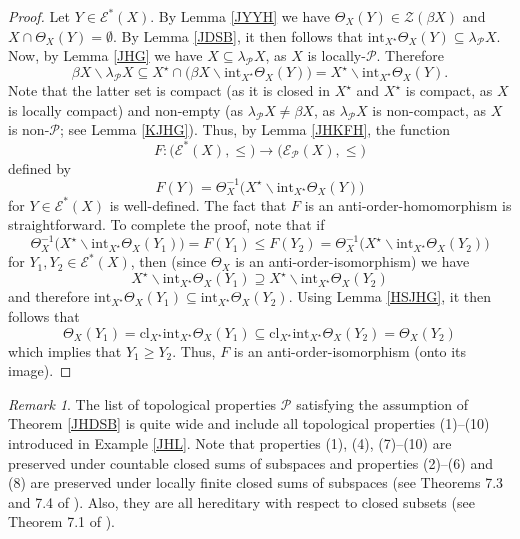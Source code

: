 \documentclass{amsart}
\theoremstyle{definition}
\theoremstyle{remark}
\newtheorem{remark}[theorem]{Remark}
\theoremstyle{notation}
\numberwithin{equation}{section}
\begin{document}
\begin{proof}
Let $Y\in{\mathscr E}^*(X)$. By Lemma \ref{JYYH}  we have $\Theta_X(Y) \in {\mathscr Z}(\beta X)$ and  $X\cap \Theta_X(Y)=\emptyset$. By Lemma
\ref{JDSB}, it then follows that  $\mbox{int}_{X^\star}\Theta_X(Y) \subseteq \lambda_{{\mathcal P}} X$. Now, by Lemma \ref{JHG} we have $X\subseteq \lambda_{{\mathcal P}} X$, as $X$ is
locally-${\mathcal P}$. Therefore
\[\beta X\backslash\lambda_{{\mathcal P}} X\subseteq X^\star\cap\big(\beta X\backslash\mbox{int}_{X^\star}\Theta_X(Y)\big)=X^\star\backslash\mbox{int}_{X^\star}\Theta_X(Y).\]
Note that the latter set is  compact (as it is closed in $X^\star$ and $X^\star$ is compact, as $X$ is locally compact) and non-empty  (as $\lambda_{{\mathcal P}} X\neq\beta X$, as $\lambda_{{\mathcal P}} X$ is non-compact, as $X$ is non-$\mathcal{P}$; see Lemma \ref{KJHG}). Thus, by Lemma \ref{JHKFH}, the function
\[F:\big({\mathscr E}^*(X),\leq\big)\rightarrow\big({\mathscr E}_{{\mathcal P}}(X),\leq\big)\]
defined by
\[F(Y)=\Theta_X^{-1}\big(X^\star\backslash\mbox{int}_{X^\star}\Theta_X(Y)\big)\]
for $Y\in {\mathscr E}^*(X)$ is well-defined. The fact that $F$ is an anti-order-homomorphism is straightforward. To complete the proof, note that if
\[\Theta_X^{-1}\big(X^\star\backslash\mbox{int}_{X^\star}\Theta_X(Y_1)\big)=F(Y_1)\leq F(Y_2)=\Theta_X^{-1}\big(X^\star\backslash\mbox{int}_{X^\star}\Theta_X(Y_2)\big)\]
for  $Y_1,Y_2\in{\mathscr E}^*(X)$, then (since $\Theta_X$ is an anti-order-isomorphism) we have
\[X^\star\backslash\mbox{int}_{X^\star}\Theta_X(Y_1)\supseteq X^\star\backslash\mbox{int}_{X^\star}\Theta_X(Y_2)\]
and therefore $\mbox{int}_{X^\star}\Theta_X(Y_1)\subseteq \mbox{int}_{X^\star}\Theta_X(Y_2)$. Using Lemma \ref{HSJHG}, it then follows that
\[\Theta_X(Y_1)=\mbox{cl}_{X^\star}\mbox{int}_{X^\star}\Theta_X(Y_1)\subseteq\mbox{cl}_{X^\star}\mbox{int}_{X^\star}\Theta_X(Y_2)=\Theta_X(Y_2)\]
which implies that $Y_1\geq Y_2$. Thus, $F$ is an  anti-order-isomorphism (onto its image).
\end{proof}

\begin{remark}\label{LJG}
The list of topological properties ${\mathcal P}$ satisfying the assumption of Theorem \ref{JHDSB} is quite  wide and include  all
topological properties (1)--(10) introduced in Example \ref{JHL}. Note that properties (1), (4), (7)--(10) are  preserved under countable closed sums of
subspaces and properties (2)--(6) and (8) are preserved under locally finite closed sums of subspaces (see Theorems 7.3 and 7.4 of \cite{Bu}).
Also, they  are all  hereditary with respect to  closed subsets (see Theorem 7.1 of \cite{Bu}).
\end{remark}
\end{document}
